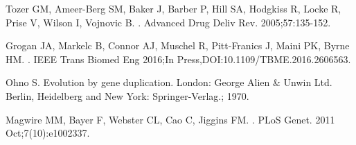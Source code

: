 \documentclass[10pt,letterpaper]{article}
\begin{document}
\begin{thebibliography}{10}
Tozer GM, Ameer-Berg SM, Baker J, Barber P, Hill SA, Hodgkiss R, Locke R, Prise V, Wilson I, Vojnovic B.
.
\newblock Advanced Drug Deliv Rev. 2005;57:135-152.

Grogan JA, Markelc B, Connor AJ, Muschel R, Pitt-Franics J, Maini PK, Byrne HM.
.
\newblock IEEE Trans Biomed Eng 2016;In Press,DOI:10.1109/TBME.2016.2606563.

Ohno S.
\newblock Evolution by gene duplication.
\newblock London: George Alien \& Unwin Ltd. Berlin, Heidelberg and New York:
  Springer-Verlag.; 1970.

Magwire MM, Bayer F, Webster CL, Cao C, Jiggins FM.
.
\newblock PLoS Genet. 2011 Oct;7(10):e1002337.

\end{thebibliography}
\end{document}
